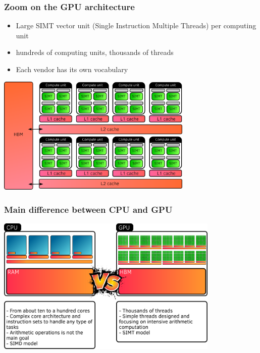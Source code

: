 \documentclass[aspectratio=169]{beamer}
\begin{document}
\begin{frame}
    \frametitle{Zoom on the GPU architecture}

\begin{itemize}
    \item Large SIMT vector unit (Single Instruction Multiple Threads) per computing unit
    \item hundreds of computing units, thousands of threads
    \item Each vendor has its own vocabulary
\end{itemize}

\hspace{0.5cm}

\begin{center}
    \includegraphics[width=0.7\textwidth]{../../images/gpu_architecture.png}
\end{center}

\end{frame}


\begin{frame}
    \frametitle{Main difference between CPU and GPU}

    \begin{center}
        \includegraphics[width=0.8\textwidth]{../../images/cpu_vs_gpu.png}
    \end{center}

\end{frame}
\end{document}
